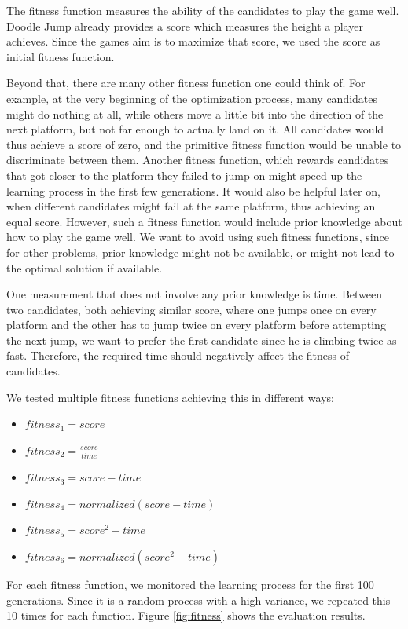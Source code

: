 \documentclass[a4paper,12pt,pagesize,headsepline,bibtotoc,titlepage,abstracton]{scrartcl}
\begin{document}
The fitness function measures the ability of the candidates to play the game well. Doodle Jump already provides a score which measures the height a player achieves. Since the games aim is to maximize that score, we used the score as initial fitness function.

Beyond that, there are many other fitness function one could think of. For example, at the very beginning of the optimization process, many candidates might do nothing at all, while others move a little bit into the direction of the next platform, but not far enough to actually land on it. All candidates would thus achieve a score of zero, and the primitive fitness function would be unable to discriminate between them. Another fitness function, which rewards candidates that got closer to the platform they failed to jump on might speed up the learning process in the first few generations. It would also be helpful later on, when different candidates might fail at the same platform, thus achieving an equal score. However, such a fitness function would include prior knowledge about how to play the game well. We want to avoid using such fitness functions, since for other problems, prior knowledge might not be available, or might not lead to the optimal solution if available. 

One measurement that does not involve any prior knowledge is time. Between two candidates, both achieving similar score, where one jumps once on every platform and the other has to jump twice on every platform before attempting the next jump, we want to prefer the first candidate since he is climbing twice as fast. Therefore, the required time should negatively affect the fitness of candidates.

We tested multiple fitness functions achieving this in different ways:
\begin{itemize}
\item $fitness_1 = score$
\item $fitness_2 = \frac{score}{time}$
\item $fitness_3 = score - time$
\item $fitness_4 = normalized(score - time)$
\item $fitness_5 = score^2 - time$
\item $fitness_6 = normalized(score^2 - time)$
\end{itemize}

For each fitness function, we monitored the learning process for the first 100 generations. Since it is a random process with a high variance, we repeated this 10 times for each function. Figure \ref{fig:fitness} shows the evaluation results. 
\end{document}
